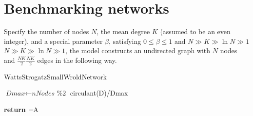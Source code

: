 \chapter[Short Chap title]{Benchmarking networks}
Specify the number of nodes $N$, the mean degree $K$ (assumed to be an even integer), and a special parameter $\beta$, satisfying $0\leq \beta \leq 1$ and $ N\gg K\gg \ln N\gg 1$ $N\gg K\gg \ln N\gg 1$, the model constructs an undirected graph with $N$ nodes and $\frac{NK}{2} \frac {NK}{2}$ edges in the following way.

\begin{algorithm}[H]
	\caption{WattsStrogatzSmallWroldNetwork}\label{alg:smallworld}
	\begin{algorithmic}[1]
		\State $\textit{Dmax} \gets \textit{nNodes \% 2}$ 
		     circulant(D)/Dmax
		
		\State \textbf{return} \textit={A}
		\EndProcedure
	\end{algorithmic}
\end{algorithm}
